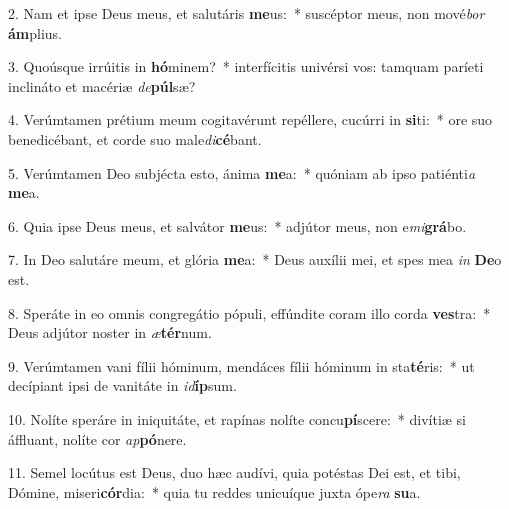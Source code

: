 2. Nam et ipse Deus meus, et salutáris \textbf{me}us:~*  suscéptor meus, non mové\textit{bor} \textbf{ám}plius.\

3. Quoúsque irrúitis in \textbf{hó}minem?~*  interfícitis univérsi vos: tamquam paríeti inclináto et macériæ \textit{de}\textbf{púl}sæ?\

4. Verúmtamen prétium meum cogitavérunt repéllere, cucúrri in \textbf{si}ti:~*  ore suo benedicébant, et corde suo male\textit{di}\textbf{cé}bant.\

5. Verúmtamen Deo subjécta esto, ánima \textbf{me}a:~*  quóniam ab ipso patiénti\textit{a} \textbf{me}a.\

6. Quia ipse Deus meus, et salvátor \textbf{me}us:~*  adjútor meus, non e\textit{mi}\textbf{grá}bo.\

7. In Deo salutáre meum, et glória \textbf{me}a:~*  Deus auxílii mei, et spes mea \textit{in} \textbf{De}o est.\

8. Speráte in eo omnis congregátio pópuli, effúndite coram illo corda \textbf{ves}tra:~*  Deus adjútor noster in \textit{æ}\textbf{tér}num.\

9. Verúmtamen vani fílii hóminum, mendáces fílii hóminum in sta\textbf{té}ris:~*  ut decípiant ipsi de vanitáte in \textit{id}\textbf{íp}sum.\

10. Nolíte speráre in iniquitáte, et rapínas nolíte concu\textbf{pí}scere:~*  divítiæ si áffluant, nolíte cor \textit{ap}\textbf{pó}nere.\

11. Semel locútus est Deus, duo hæc audívi, quia potéstas Dei est, et tibi, Dómine, miseri\textbf{cór}dia:~*  quia tu reddes unicuíque juxta ópe\textit{ra} \textbf{su}a.\

